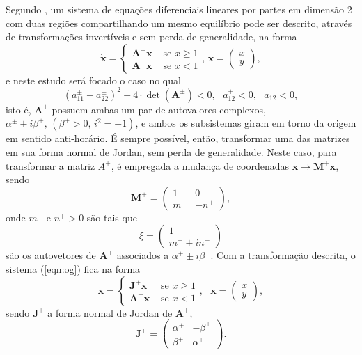 Segundo  \cite{Huan:etal:2012}, um sistema de equações diferenciais lineares por partes em dimensão 2 com duas regiões compartilhando um mesmo equilíbrio pode ser descrito, através de transformações invertíveis e sem perda de generalidade, na forma
\begin{equation}
\label{eqn:og}
\dot{\mathbf{x}}=\left\{\begin{array}{ll}
\mathbf{A}^{+} \mathbf{x} & \text { se } x \geq 1 \\
\mathbf{A}^{-} \mathbf{x} & \text { se } x<1
\end{array}
\text{, }\mathbf{x}=
\begin{pmatrix}
x\\
y
\end{pmatrix}
\right.,
\end{equation}
 e neste estudo será focado o caso no qual
\begin{equation}
\label{cond}
(a_{11}^{\pm}+a_{22}^{\pm})^{2}-4 \cdot \operatorname{det}(\mathbf{A}^{\pm})<0,\text{ }a_{12}^{+}<0,\text{ }a_{12}^{-}<0,
\end{equation}
isto é, $\mathbf{A}^{\pm}$ possuem ambas um par de autovalores complexos, $\alpha^{\pm} \pm i \beta^{\pm}\text{, }(\beta^{\pm}>0\text{, } i^{2}=-1)$, e ambos os subsistemas giram em torno da origem em sentido anti-horário. É sempre possível, então, transformar uma das matrizes em sua forma normal de Jordan, sem perda de generalidade. Neste caso, para transformar a matriz $A^+$, é empregada a mudança de coordenadas $\mathbf{x} \rightarrow \mathbf{M^+ x}$, sendo
\[
\mathbf{M^+}=\left(\begin{array}{cc}
1 & 0 \\
m^+ & -n^+
\end{array}\right),
\]
onde $m^+$ e $n^+>0$ são tais que 
\[
\xi=\begin{pmatrix}
1\\
m^+ \pm in^+
\end{pmatrix}
\] 
são os autovetores de $\mathbf{A}^{+}$ associados a $\alpha^{+} \pm i \beta^{+}$. Com a transformação descrita, o sistema (\ref{eqn:og}) fica na forma
\begin{equation}
\label{eqn:jor}
\dot{\mathbf{x}}=\left\{\begin{array}{ll}
\mathbf{J}^{+} \mathbf{x} & \text { se } x \geq 1 \\
\mathbf{A}^{-} \mathbf{x} & \text { se } x<1
\end{array},\text{ }\mathbf{x}=\begin{pmatrix}
x\\
y
\end{pmatrix}\right.,
\end{equation}
sendo $\mathbf{J}^{+}$ a forma normal de Jordan de $\mathbf{A}^{+}$,
\[
\mathbf{J}^{+}=\left(\begin{array}{cc}
\alpha^{+} & -\beta^{+} \\
\beta^{+} & \alpha^{+}
\end{array}\right).
\]

